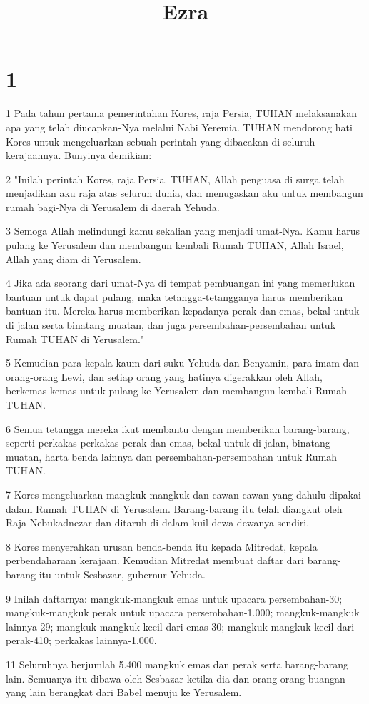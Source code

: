 

\title{Ezra}


\chapter{1}

\par 1 Pada tahun pertama pemerintahan Kores, raja Persia, TUHAN melaksanakan apa yang telah diucapkan-Nya melalui Nabi Yeremia. TUHAN mendorong hati Kores untuk mengeluarkan sebuah perintah yang dibacakan di seluruh kerajaannya. Bunyinya demikian:
\par 2 "Inilah perintah Kores, raja Persia. TUHAN, Allah penguasa di surga telah menjadikan aku raja atas seluruh dunia, dan menugaskan aku untuk membangun rumah bagi-Nya di Yerusalem di daerah Yehuda.
\par 3 Semoga Allah melindungi kamu sekalian yang menjadi umat-Nya. Kamu harus pulang ke Yerusalem dan membangun kembali Rumah TUHAN, Allah Israel, Allah yang diam di Yerusalem.
\par 4 Jika ada seorang dari umat-Nya di tempat pembuangan ini yang memerlukan bantuan untuk dapat pulang, maka tetangga-tetangganya harus memberikan bantuan itu. Mereka harus memberikan kepadanya perak dan emas, bekal untuk di jalan serta binatang muatan, dan juga persembahan-persembahan untuk Rumah TUHAN di Yerusalem."
\par 5 Kemudian para kepala kaum dari suku Yehuda dan Benyamin, para imam dan orang-orang Lewi, dan setiap orang yang hatinya digerakkan oleh Allah, berkemas-kemas untuk pulang ke Yerusalem dan membangun kembali Rumah TUHAN.
\par 6 Semua tetangga mereka ikut membantu dengan memberikan barang-barang, seperti perkakas-perkakas perak dan emas, bekal untuk di jalan, binatang muatan, harta benda lainnya dan persembahan-persembahan untuk Rumah TUHAN.
\par 7 Kores mengeluarkan mangkuk-mangkuk dan cawan-cawan yang dahulu dipakai dalam Rumah TUHAN di Yerusalem. Barang-barang itu telah diangkut oleh Raja Nebukadnezar dan ditaruh di dalam kuil dewa-dewanya sendiri.
\par 8 Kores menyerahkan urusan benda-benda itu kepada Mitredat, kepala perbendaharaan kerajaan. Kemudian Mitredat membuat daftar dari barang-barang itu untuk Sesbazar, gubernur Yehuda.
\par 9 Inilah daftarnya: mangkuk-mangkuk emas untuk upacara persembahan-30; mangkuk-mangkuk perak untuk upacara persembahan-1.000; mangkuk-mangkuk lainnya-29; mangkuk-mangkuk kecil dari emas-30; mangkuk-mangkuk kecil dari perak-410; perkakas lainnya-1.000.
\par 11 Seluruhnya berjumlah 5.400 mangkuk emas dan perak serta barang-barang lain. Semuanya itu dibawa oleh Sesbazar ketika dia dan orang-orang buangan yang lain berangkat dari Babel menuju ke Yerusalem.

